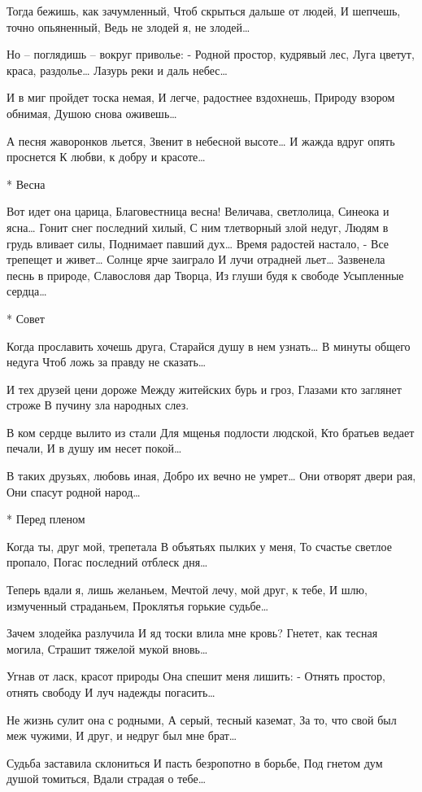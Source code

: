 Тогда бежишь, как зачумленный,
Чтоб скрыться дальше от людей,
И шепчешь, точно опьяненный,
Ведь не злодей я, не злодей…

Но – поглядишь – вокруг приволье: -
Родной простор, кудрявый лес,
Луга цветут, краса, раздолье…
Лазурь реки и даль небес…

И в миг пройдет тоска немая,
И легче, радостнее вздохнешь,
Природу взором обнимая,
Душою снова оживешь…

А песня жаворонков льется,
Звенит в небесной высоте…
И жажда вдруг опять проснется
К любви, к добру и красоте…


* Весна

Вот идет она царица,
Благовестница весна!
Величава, светлолица,
Синеока и ясна…
Гонит снег последний хилый,
С ним тлетворный злой недуг,
Людям в грудь вливает силы,
Поднимает павший дух…
Время радостей настало, -
Все трепещет и живет…
Солнце ярче заиграло
И лучи отрадней льет…
Зазвенела песнь в природе,
Славословя дар Творца,
Из глуши будя к свободе
Усыпленные сердца…


* Совет

Когда прославить хочешь друга,
Старайся душу в нем узнать…
В минуты общего недуга
Чтоб ложь за правду не сказать…

И тех друзей цени дороже
Между житейских бурь и гроз,
Глазами кто заглянет строже
В пучину зла народных слез.

В ком сердце вылито из стали
Для мщенья подлости людской,
Кто братьев ведает печали,
И в душу им несет покой…

В таких друзьях, любовь иная,
Добро их вечно не умрет…
Они отворят двери рая,
Они спасут родной народ…


* Перед пленом

Когда ты, друг мой, трепетала
В объятьях пылких у меня,
То счастье светлое пропало,
Погас последний отблеск дня…

Теперь вдали я, лишь желаньем,
Мечтой лечу, мой друг, к тебе,
И шлю, измученный страданьем,
Проклятья горькие судьбе…

Зачем злодейка разлучила
И яд тоски влила мне кровь?
Гнетет, как тесная могила,
Страшит тяжелой мукой вновь…

Угнав от ласк, красот природы
Она спешит меня лишить: -
Отнять простор, отнять свободу
И луч надежды погасить…

Не жизнь сулит она с родными,
А серый, тесный каземат,
За то, что свой был меж чужими,
И друг, и недруг был мне брат…

Судьба заставила склониться
И пасть безропотно в борьбе,
Под гнетом дум душой томиться,
Вдали страдая о тебе…


